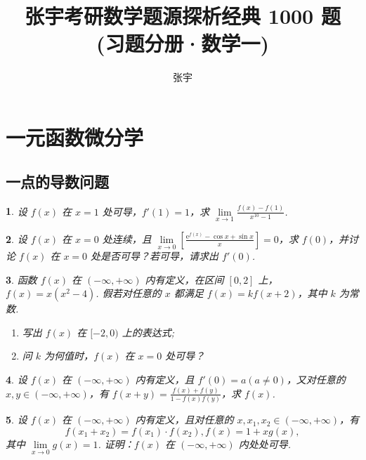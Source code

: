 \documentclass[openany,twocolumn]{ctexbook}
\title{张宇考研数学题源探析经典 1000 题\\(习题分册·数学一)}
\author{张宇}
\theoremstyle{change}
\newtheorem{ti}{}[section]
\def\ee{\mathrm{e}}
\edef\lim{\lim\limits}
\begin{document}
	\mainmatter
	
	\section{一元函数微分学}
	\subsection{一点的导数问题}

	\begin{ti}
		设 $f(x)$ 在 $x = 1$ 处可导，$f'(1) = 1$，求 $\lim_{x \to 1} \frac{f(x) - f(1)}{x^{10} - 1}$.
	\end{ti}

	\begin{ti}
		设 $f(x)$ 在 $x = 0$ 处连续，且 $\lim_{x \to 0} \left[ \frac{\ee^{f(x)} - \cos x + \sin x}{x} \right] = 0$，求 $f(0)$，并讨论 $f(x)$ 在 $x = 0$ 处是否可导？若可导，请求出 $f'(0)$.
	\end{ti}

	\begin{ti}
		函数 $f(x)$ 在 $(-\infty,+\infty)$ 内有定义，在区间 $[0,2]$ 上，$f(x) = x\left( x^{2} - 4 \right)$. 假若对任意的 $x$ 都满足 $f(x) = k f(x + 2)$，其中 $k$ 为常数.
		\begin{enumerate}
			\item 写出 $f(x)$ 在 $[-2,0)$ 上的表达式;
			\item 问 $k$ 为何值时，$f(x)$ 在 $x = 0$ 处可导？
		\end{enumerate}
	\end{ti}

	\begin{ti}
		设 $f(x)$ 在 $(-\infty,+\infty)$ 内有定义，且 $f'(0) = a(a \ne 0)$，又对任意的 $x,y \in (-\infty,+\infty)$，有 $f(x + y) = \frac{f(x) + f(y)}{1 - f(x)f(y)}$，求 $f(x)$.
	\end{ti}
	
	\begin{ti}
		设 $f(x)$ 在 $(-\infty,+\infty)$ 内有定义，且对任意的 $x,x_{1},x_{2} \in (-\infty,+\infty)$，有
		\[
			f(x_{1} + x_{2}) = f(x_{1}) \cdot f(x_{2}),f(x) = 1 + xg(x),
		\]
		其中 $\lim_{x \to 0} g(x) = 1$. 证明：$f(x)$ 在 $(-\infty,+\infty)$ 内处处可导.
	\end{ti}
\end{document}
